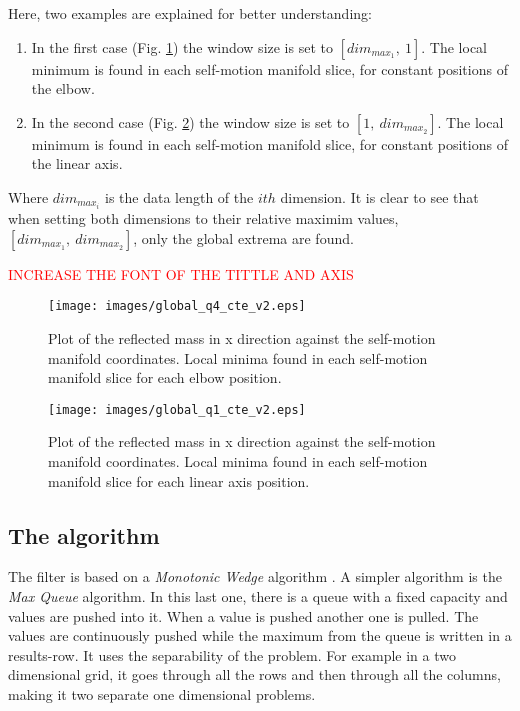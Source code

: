 Here, two examples are explained for better understanding:
\begin{enumerate}
	\item In the first case (Fig. \ref{fig:maxminfilter1}) the window size is set to $[dim_{max_{1}}, \ 1]$. The local minimum is found in each self-motion manifold slice, for constant positions of the elbow.
	\item In the second case (Fig. \ref{fig:maxminfilter2}) the window size is set to $[1, \ dim_{max_{2}}]$. The local minimum is found in each self-motion manifold slice, for constant positions of the linear axis.

\end{enumerate}

Where $dim_{max_{i}}$ is the data length of the $ith$ dimension. It is clear to see that when setting both dimensions to their relative maximim values, $[dim_{max_{1}}, \ dim_{max_{2}}]$, only the global extrema are found.

\textcolor{red}{INCREASE THE FONT OF THE TITTLE AND AXIS}

\begin{figure}[htb]
	\centerline{
		\texttt{[image: images/global\_q4\_cte\_v2.eps]}}
	\caption{Plot of the reflected mass in x direction against the self-motion
		manifold coordinates. Local minima found in each self-motion manifold slice for each elbow position. }
	\label{fig:maxminfilter1}
\end{figure}

\begin{figure}[htb]
	\centerline{
		\texttt{[image: images/global\_q1\_cte\_v2.eps]}}
	\caption{Plot of the reflected mass in x direction against the self-motion
		manifold coordinates. Local minima found in each self-motion manifold slice for each linear axis position. }
	\label{fig:maxminfilter2}
\end{figure}





\subsection{The algorithm}
\label{subsec:global_alg}

The filter is based on a \textit{Monotonic Wedge} algorithm \cite{Lemire}.
A simpler algorithm is the \textit{Max Queue} algorithm. In this last one, there is a queue with a fixed capacity and values are pushed into it. When a value is pushed another one is pulled. The values are continuously pushed while the maximum from the queue is written in a results-row.
It uses the separability of the problem.  For example in a two dimensional grid, it goes through all the rows and then through all the columns, making it two separate one dimensional problems.

